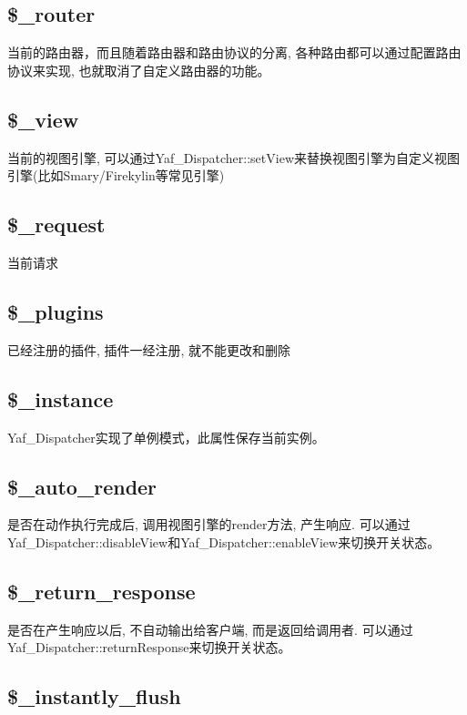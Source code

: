 \subsection{\$\_router}

当前的路由器，而且随着路由器和路由协议的分离, 各种路由都可以通过配置路由协议来实现, 也就取消了自定义路由器的功能。

\subsection{\$\_view}

当前的视图引擎, 可以通过Yaf\_Dispatcher::setView来替换视图引擎为自定义视图引擎(比如Smary/Firekylin等常见引擎)

\subsection{\$\_request}

当前请求

\subsection{\$\_plugins}

已经注册的插件, 插件一经注册, 就不能更改和删除

\subsection{\$\_instance}

Yaf\_Dispatcher实现了单例模式，此属性保存当前实例。

\subsection{\$\_auto\_render}

是否在动作执行完成后, 调用视图引擎的render方法, 产生响应. 可以通过Yaf\_Dispatcher::disableView和Yaf\_Dispatcher::enableView来切换开关状态。

\subsection{\$\_return\_response}

是否在产生响应以后, 不自动输出给客户端, 而是返回给调用者. 可以通过Yaf\_Dispatcher::returnResponse来切换开关状态。


\subsection{\$\_instantly\_flush}

